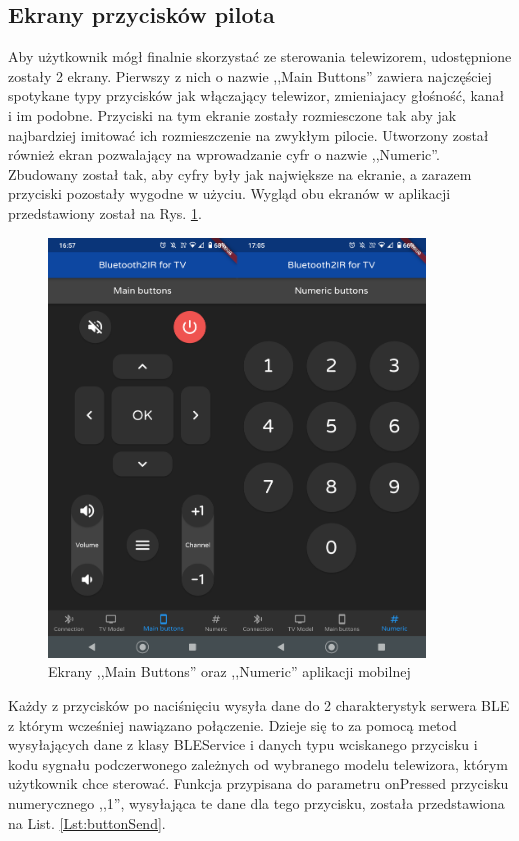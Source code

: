 \documentclass[12pt,twoside,draft]{article}
\begin{document}
\subsection{Ekrany przycisków pilota}
Aby użytkownik mógł finalnie skorzystać ze sterowania telewizorem, udostępnione zostały 2 ekrany. Pierwszy z nich o nazwie ,,Main Buttons'' zawiera najczęściej spotykane typy przycisków jak włączający telewizor, zmieniajacy głośność, kanał i im podobne. Przyciski na tym ekranie zostały rozmiesczone tak aby jak najbardziej imitować ich rozmieszczenie na zwykłym pilocie. 
Utworzony został również ekran pozwalający na wprowadzanie cyfr o nazwie ,,Numeric''. Zbudowany został tak, aby cyfry były jak największe na ekranie, a zarazem przyciski pozostały wygodne w użyciu. Wygląd obu ekranów w aplikacji przedstawiony został na Rys. \ref*{Fig:buttonScreens}.

\begin{figure}[ht]
   \centering
   \includegraphics[width=10cm]{images/buttonScreens.png}
   \caption{Ekrany ,,Main Buttons'' oraz ,,Numeric'' aplikacji mobilnej}
   \label{Fig:buttonScreens}
\end{figure}

Każdy z przycisków po naciśnięciu wysyła dane do 2 charakterystyk serwera BLE z którym wcześniej nawiązano połączenie. Dzieje się to za pomocą metod wysyłających dane z klasy BLEService i danych typu wciskanego przycisku i kodu sygnału podczerwonego zależnych od wybranego modelu telewizora, którym użytkownik chce sterować. Funkcja przypisana do parametru onPressed przycisku numerycznego ,,1'', wysyłająca te dane dla tego przycisku, została przedstawiona na List. \ref*{Lst:buttonSend}.
\end{document}
